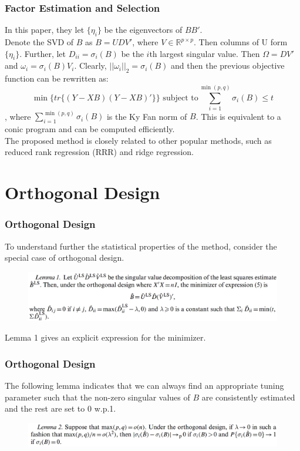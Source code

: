 \documentclass{beamer}
\begin{document}
	\begin{frame}
		\frametitle{Factor Estimation and Selection}
		In this paper, they let $\{\eta_i\}$ be the eigenvectors of $BB'$.\\ 
		\vspace{\baselineskip}
		Denote the SVD of $B$ as $B = UDV'$, where $V\in\mathbb{R}^{p\times p}$. Then columns of U form $\{\eta_i\}$. Further, let $D_{ii} = \sigma_i(B)$ be the $i$th largest singular value. Then $\Omega = DV'$ and $\omega_i=\sigma_i(B)V_i$. Clearly, $||\omega_i||_2 = \sigma_i(B)$ and then the previous objective function can be rewritten as:
		$$\min\{tr\{(Y-XB)(Y-XB)'\}\}\,\,\text{subject to}\sum_{i=1}^{\min(p,q)}\sigma_i(B)\leq t$$
		, where $\sum_{i=1}^{\min(p,q)}\sigma_i(B)$ is the Ky Fan norm of $B$. This is equivalent to a conic program and can be computed efficiently.\\
		\vspace{\baselineskip}
		The proposed method is closely related to other popular methods, such as reduced rank regression (RRR) and ridge regression.
	\end{frame}
	
	\section{Orthogonal Design}
	
	\begin{frame}
		\frametitle{Orthogonal Design}
		To understand further the statistical properties of the method, consider the special case of orthogonal design.
		\begin{figure}
			\includegraphics[width=1\linewidth]{image001.png}
		\end{figure}
		Lemma 1 gives an explicit expression for the minimizer.
	\end{frame}
	
	\begin{frame}
		\frametitle{Orthogonal Design}
		The following lemma indicates that we can always find an appropriate tuning parameter such that the non-zero singular values of $B$ are consistently estimated and the rest are set to 0 w.p.1.
		\begin{figure}
			\includegraphics[width=1\linewidth]{image002.png}
		\end{figure}
	\end{frame}
	
\end{document}

